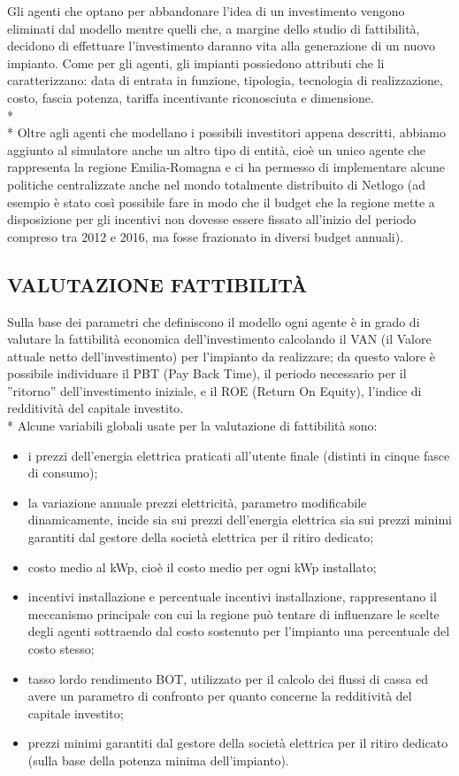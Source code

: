 \documentclass[12pt,a4paper,openright,twoside]{report}
\begin{document}
Gli agenti che optano per abbandonare l'idea di un investimento vengono eliminati dal modello mentre quelli che, a margine dello studio di fattibilità, decidono di effettuare l'investimento daranno vita alla generazione di un nuovo impianto. Come per gli agenti, gli impianti possiedono attributi che li caratterizzano: data di entrata in funzione, tipologia, tecnologia di realizzazione, costo, fascia potenza, tariffa incentivante riconosciuta e dimensione.\\* \\*
Oltre agli agenti che modellano i possibili investitori appena descritti, abbiamo aggiunto al simulatore anche un altro tipo di entità, cioè un unico agente che rappresenta la regione Emilia-Romagna e ci ha permesso di implementare alcune politiche centralizzate anche nel mondo totalmente distribuito di Netlogo (ad esempio è stato così possibile fare in modo che il budget che la regione mette a disposizione per gli incentivi non dovesse essere fissato all'inizio del periodo compreso tra 2012 e 2016, ma fosse frazionato in diversi budget annuali).

\subsection{VALUTAZIONE FATTIBILITÀ}
Sulla base dei parametri che definiscono il modello ogni agente è in grado di valutare la fattibilità economica dell'investimento calcolando il VAN (il Valore attuale netto dell'investimento) per l'impianto da realizzare; da questo valore è possibile individuare il PBT (Pay Back Time), il periodo necessario per il ''ritorno'' dell'investimento iniziale, e il ROE (Return On Equity), l'indice di redditività del capitale investito.\\*
Alcune variabili globali usate per la valutazione di fattibilità sono:
\begin{itemize}
\item i prezzi dell'energia elettrica praticati all'utente finale (distinti in cinque fasce di consumo);
\item la variazione annuale prezzi elettricità, parametro modificabile dinamicamente, incide sia sui prezzi dell'energia elettrica sia sui prezzi minimi garantiti dal gestore della società elettrica per il ritiro dedicato;
\item costo medio al kWp, cioè il costo medio per ogni kWp installato;
\item incentivi installazione e percentuale incentivi installazione, rappresentano il meccanismo principale con cui la regione può tentare di influenzare le scelte degli agenti sottraendo dal costo sostenuto per l'impianto una percentuale del costo stesso;
\item tasso lordo rendimento BOT, utilizzato per il calcolo dei flussi di cassa ed avere un parametro di confronto per quanto concerne la redditività del capitale investito;
\item prezzi minimi garantiti dal gestore della società elettrica per il ritiro dedicato (sulla base della potenza minima dell'impianto).
\end{itemize}
\end{document}
